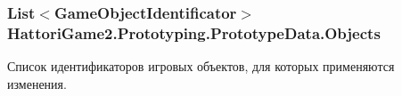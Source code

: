 \subsubsection[{Objects}]{\setlength{\rightskip}{0pt plus 5cm}List$<${\bf Game\+Object\+Identificator}$>$ Hattori\+Game2.\+Prototyping.\+Prototype\+Data.\+Objects\hspace{0.3cm}{\ttfamily [get]}}\label{class_hattori_game2_1_1_prototyping_1_1_prototype_data_ad41d44ad2fdeaca9288581c3642f6efa_ad41d44ad2fdeaca9288581c3642f6efa}


Список идентификаторов игровых объектов, для которых применяются изменения. 


